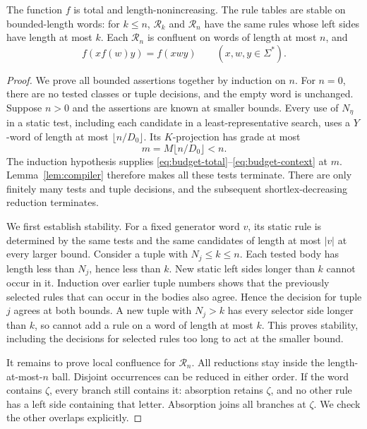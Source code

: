 \begin{lemma}\label{lem:bootstrap}
The function $f$ is total and length-nonincreasing.  The rule tables
are stable on bounded-length words: for $k\le n$, $\mathcal R_k$
and $\mathcal R_n$ have the same rules whose left sides have length
at most $k$.  Each $\mathcal R_n$ is confluent on words of length at
most $n$, and
\begin{equation}\label{eq:f-context}
 f(xf(w)y)=f(xwy)\qquad(x,w,y\in\Sigma^*).
\end{equation}
\end{lemma}

\begin{proof}
We prove all bounded assertions together by induction on $n$.
For $n=0$, there are no tested classes or tuple decisions, and the
empty word is unchanged.  Suppose $n>0$ and the assertions are known
at smaller bounds.  Every use of $N_\eta$ in a static test, including
each candidate in a least-representative search, uses a $Y$-word of length at most
$\lfloor n/D_0\rfloor$.  Its $K$-projection has grade at most
\begin{equation}\label{eq:strict-dependency}
 m=M\lfloor n/D_0\rfloor<n.
\end{equation}
The induction hypothesis supplies
\eqref{eq:budget-total}--\eqref{eq:budget-context} at $m$.
Lemma~\ref{lem:compiler} therefore makes all these tests terminate.
There are only finitely many tests and tuple decisions, and the
subsequent shortlex-decreasing reduction terminates.

We first establish stability.  For a fixed generator word $v$, its
static rule is determined by the same tests and the same candidates
of length at most $|v|$ at every larger bound.  Consider a tuple with
$N_j\le k\le n$.  Each tested body has length less than $N_j$, hence
less than $k$.  New static left sides longer than $k$ cannot occur
in it.  Induction over earlier tuple numbers shows that the previously
selected rules that can occur in the bodies also agree.  Hence the
decision for tuple $j$ agrees at both bounds.  A new tuple with
$N_j>k$ has every selector side longer than $k$, so cannot add a rule
on a word of length at most $k$.  This proves stability, including
the decisions for selected rules too long to act at the smaller bound.

It remains to prove local confluence for $\mathcal R_n$.  All
reductions stay inside the length-at-most-$n$ ball.  Disjoint
occurrences can be reduced in either order. If the word contains
$\zeta$, every branch still contains it: absorption retains $\zeta$,
and no other rule has a left side containing that letter. Absorption joins all
branches at $\zeta$.  We check the other overlaps explicitly.


\end{proof}

